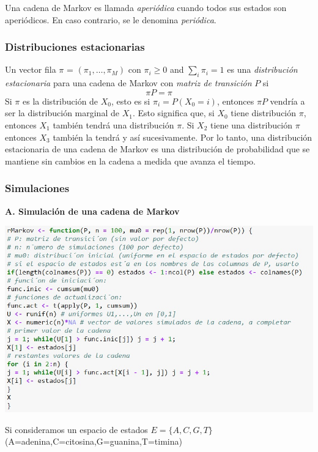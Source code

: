 \documentclass[10pt,a4paper]{article}
\theoremstyle{definition}
\theoremstyle{remark}
\newenvironment{Figure}
  {\par\medskip\noindent\minipage{\linewidth}}
  {\endminipage\par\medskip}
\begin{document}
\begin{multicols}{2}
Una cadena de Markov es llamada \textit{aperiódica} cuando todos sus estados son aperiódicos. En caso contrario, se le denomina \textit{periódica}.

\subsubsection{Distribuciones estacionarias}
Un vector fila $\pi$ = $(\pi_{1},\dots,\pi_{M})$ con $\pi_{i}\geq0$ and $\sum_{i}\pi_{i} = 1$ es una \textit{distribución estacionaria} para una cadena de Markov con \textit{matriz de transición} $P$ si
\[
\pi P = \pi
\]
Si $\pi$ es la distribución de $X_{0}$, esto es si $\pi_{i} = P(X_{0} = i)$, entonces $\pi P$ vendría a ser la distribución marginal de $X_{1}$. Esto significa que, si $X_{0}$ tiene distribución $\pi$, entonces $X_{1}$ también tendrá una distribución $\pi$. Si $X_{2}$ tiene una distribución $\pi$ entonces $X_{3}$ también la tendrá y así sucesivamente.
Por lo tanto, una distribución estacionaria de una cadena de Markov es una distribución de probabilidad que se mantiene sin cambios en la cadena a medida que avanza el tiempo.
\subsubsection{Simulaciones}
\textbf{A. Simulación de una cadena de Markov}

\begin{Figure}
	\centering
	\includegraphics[scale=0.30]{fun1.jpeg}
	\label{figura1}
\end{Figure}

Si consideramos un espacio de estados $E=\{A,C,G,T\}$ (A=adenina,C=citosina,G=guanina,T=timina)


\end{multicols}
\end{document}
